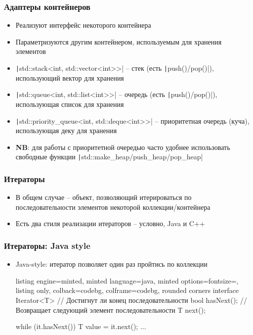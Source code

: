 \documentclass[10pt]{beamer}
\begin{document}
\begin{frame}[fragile]
\frametitle{Адаптеры контейнеров}
\begin{itemize}
\item Реализуют интерфейс некоторого контейнера
\pause
\item Параметризуются другим контейнером, используемым для хранения элементов
\pause
\item \texttt|std::stack<int, std::vector<int>>| -- стек (есть \texttt|push()/pop()|), использующий вектор для хранения
\pause
\item \texttt|std::queue<int, std::list<int>>| -- очередь (есть \texttt|push()/pop()|), использующая список для хранения
\pause
\item \texttt|std::priority_queue<int, std::deque<int>>| -- приоритетная очередь (куча), использующая деку для хранения
\pause
\item \textbf{NB}: для работы с приоритетной очередью часто удобнее использовать свободные функции \texttt|std::make_heap/push_heap/pop_heap|
\end{itemize}
\end{frame}

\begin{frame}[fragile]
\frametitle{Итераторы}
\begin{itemize}
\item В общем случае -- объект, позволяющий итерироваться по последовательности элементов некоторой коллекции/контейнера
\pause
\item Есть два стиля реализации итераторов -- условно, Java и C++
\end{itemize}
\end{frame}

\begin{frame}[fragile]
\frametitle{Итераторы: Java style}
\begin{itemize}
\item Java-style: итератор позволяет один раз пройтись по коллекции
\pause
{}
\begin{tcblisting}{listing engine=minted, minted language=java, minted options={fontsize=\scriptsize}, listing only, colback=codebg, colframe=codebg, rounded corners}
interface Iterator<T> {
  // Достигнут ли конец последовательности
  bool hasNext();
  // Возвращает следующий элемент последовательности
  T next();
}

while (it.hasNext()) {
  T value = it.next();
  ...
}
\end{tcblisting}
\end{itemize}
\end{frame}
\end{document}
